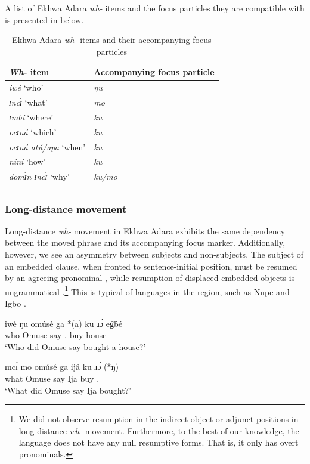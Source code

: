 \documentclass[output=paper,colorlinks,citecolor=brown
]{langscibook}
\begin{document}
A list of Ekhwa Adara \textit{wh-} items and the focus particles they are compatible with is presented in  below.

\begin{table}
\caption{Ekhwa Adara \textit{wh-} items and their accompanying focus particles}
\label{tab:matte:1}

\begin{tabular}{ll}
\lsptoprule
    \textit{Wh-} item & Accompanying focus particle\\
    \midrule  
    \textit{iwé} `who' & \textit{ŋu}\\
    \textit{ɪncɪ́} `what' & \textit{mo}\\
    \textit{ɪmbí} `where' & \textit{ku}\\
    \textit{ocɪná} `which' & \textit{ku}\\
    \textit{ocɪná atú/apa} `when' & \textit{ku}\\
    \textit{níní} `how' & \textit{ku}\\
    \textit{domɪ́n ɪncɪ́} `why' & \textit{ku/mo}\\
\lspbottomrule
\end{tabular}
\end{table}

\subsubsection{Long-distance movement} \label{sec:matte:3.2.2}

Long-distance \textit{wh-} movement in Ekhwa Adara exhibits the same dependency between the moved phrase and its accompanying focus marker. Additionally, however, we see an asymmetry between subjects and non-subjects. The subject of an embedded clause, when fronted to sentence-initial position, must be resumed by an agreeing pronominal , while resumption of displaced embedded objects is ungrammatical .\footnote{We did not observe resumption in the indirect object or adjunct positions in long-distance \textit{wh-} movement. Furthermore, to the best of our knowledge, the language does not have any null resumptive forms. That is, it only has overt pronominals.} This is typical of languages in the region, such as Nupe \citep{Kandybowicz2004, Kandybowicz2008} and Igbo \citep{AmaechiGeorgi2019}. 

\ea \label{ex:matte:16}
\begin{xlist}

\ex \label{ex:matte:16a}
\gll iwé ŋu omúsé ga *(a) ku ɹɔ́ eg͡bé\\
who \Foc{} Omuse say \Tsg{}.\Nom{} \Pfv{} buy house\\
\glt `Who did Omuse say bought a house?'

\ex \label{ex:matte:16b}
\gll ɪncɪ́ mo omúsé ga ijâ ku ɹɔ́ (*ŋ)\\
what \Foc{} Omuse say Ija \Pfv{} buy \Tsg{}.\Acc{}\\
\glt `What did Omuse say Ija bought?'

\end{xlist}
\z
\end{document}
